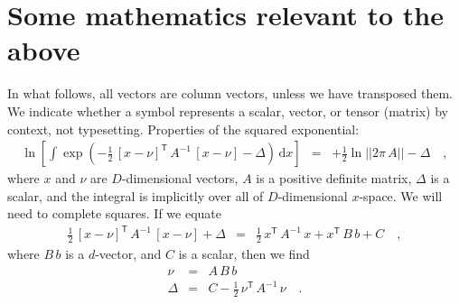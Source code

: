 \documentclass[manuscript, letterpaper]{aastex6}
\newcommand{\project}[1]{\textsl{#1}}
\newcommand{\acronym}[1]{{\small{#1}}}
\newcommand{\apogee}{\project{\acronym{APOGEE}}}
\newcommand{\dd}{\mathrm{d}}
\newcommand{\transp}[1]{{#1}^{\!\mathsf{T}}}
\newcommand{\inv}[1]{{#1}^{-1}}
\begin{document}




\appendix
\section{Some mathematics relevant to the above}

In what follows, all vectors are column vectors, unless we have transposed them.
We indicate whether a symbol represents a scalar, vector, or tensor
(matrix) by context, not typesetting.
Properties of the squared exponential:
\begin{eqnarray}
  \ln\left[\int\exp(-\frac{1}{2}\,\transp{[x-\nu]}\,\inv{A}\,[x-\nu] - \Delta)\,\dd x\right]
  &=& +\frac{1}{2}\ln ||2\pi\,A|| -\Delta
  \quad ,
\end{eqnarray}
where $x$ and $\nu$ are $D$-dimensional vectors, $A$ is a positive definite
matrix, $\Delta$ is a scalar, and the integral is implicitly over all
of $D$-dimensional $x$-space.
We will need to complete squares.
If we equate
\begin{eqnarray}
  \frac{1}{2}\,\transp{[x-\nu]}\,\inv{A}\,[x-\nu] + \Delta
  &=& \frac{1}{2}\,\transp{x}\,\inv{A}\,x + \transp{x}\,B\,b + C
  \quad ,
\end{eqnarray}
where $B\,b$ is a $d$-vector, and $C$ is a scalar, then we find
\begin{eqnarray}
  \nu &=& A\,B\,b
  \\
  \Delta & = & C - \frac{1}{2}\,\transp{\nu}\,\inv{A}\,\nu
  \quad .
\end{eqnarray}
\end{document}
